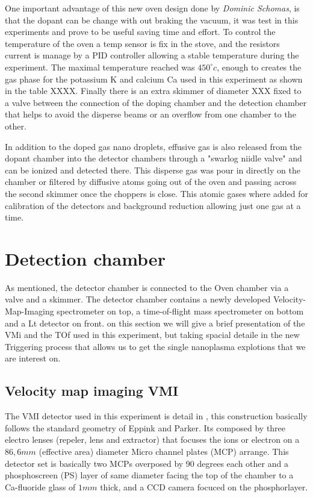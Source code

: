 One important advantage of this new oven design done by \textit{Dominic Schomas},  is that the dopant can be change with out braking the vacuum, it was test in this experiments and prove to be useful saving time and effort. To control the temperature of the oven a temp sensor is fix in the stove, and the resistors current is manage by a PID controller allowing a stable temperature during the experiment. The maximal temperature reached was $450^{\circ}c$,  enough to creates the gas phase for the potassium K and calcium Ca used in this experiment as shown in the table XXXX. Finally there is an  extra skimmer of diameter XXX fixed to a valve between the connection of the doping chamber and the detection chamber that helps to avoid the disperse beams or an overflow from one chamber to the other.

In addition to the doped gas nano droplets, effusive gas is also released from the dopant chamber into the detector chambers through a "swarlog niidle valve" and can be ionized and detected there. This disperse gas was pour in directly on the chamber or filtered by diffusive atoms going out of the oven and passing across the second skimmer once the choppers is close. This atomic gases where added for calibration of the detectors and background reduction allowing just one gas at a time.

\section{Detection chamber}

As mentioned, the detector chamber is connected to the Oven chamber via a valve and a skimmer. The detector chamber contains a newly developed Velocity-Map-Imaging
spectrometer on top, a time-of-flight mass spectrometer on bottom and a Lt detector on front. on this section we will give a brief presentation of  the VMi and the TOf used in this experiment, but taking spacial detaile in the new Triggering process that allows us to get the single nanoplasma explotions that we are interest on. 

\subsection{Velocity map imaging VMI}

The VMI detector used in this experiment is detail in \cite{schomas_compact_2017}, this construction basically follows the standard geometry of Eppink and Parker\cite{eppink_velocity_1997}. Its composed by three electro lenses (repeler, lens and extractor) that focuses the ions or electron on a $86,6mm$ (effective area) diameter Micro channel plates (MCP) arrange. This detector set is basically  two MCPs overposed by 90 degrees each other and a phosphoscreen (PS) layer of same diameter facing the top of the chamber to a Ca-fluoride glass of $1mm$ thick, and a CCD camera focuced on the phosphorlayer. 

